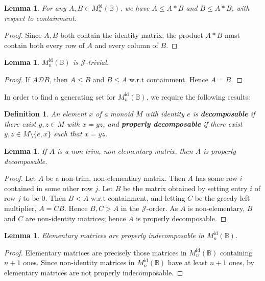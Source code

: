 \documentclass[11pt]{article}
\newtheorem{lemma}[thm]{Lemma}
\newtheorem{defi}[thm]{Definition}
\newcommand{\defn}[1]{\textbf{\textit{#1}}}
\numberwithin{equation}{section}
\newcommand{\B}{\mathbb{B}}
\newcommand{\Refn}{M_n^{\text{id}}(\B)}
\newcommand{\D}{\mathscr{D}}
\newcommand{\J}{\mathscr{J}}
\begin{document}
\begin{lemma}
  For any $A, B \in \Refn$, we have $A \leq A * B$ and $B \leq A * B$, with
  respect to containment.
\end{lemma}
\begin{proof}
  Since $A, B$ both contain the identity matrix, the product $A * B$ must
  contain both every row of $A$ and every column of $B$.
\end{proof}

\begin{lemma}
  $\Refn$ is $\J$-trivial. 
\end{lemma}
\begin{proof}
  If $A \D B$, then $A \leq B$ and $B \leq A$ w.r.t containment. Hence $A = B$.    
\end{proof}


In order to find a generating set for $\Refn$, we require the following results:

\begin{defi}
  An element $x$ of a monoid $M$ with identity $e$ is \defn{decomposable} if
  there exist $y, z \in M$ with $x = yz$, and \defn{properly decomposable} if
  there exist $y, z \in M\setminus\{e, x\}$ such that $x = yz$.
\end{defi}

\begin{lemma}
  If $A$ is a non-trim, non-elementary matrix, then $A$ is properly
  decomposable.
\end{lemma}
\begin{proof}
Let $A$ be a non-trim, non-elementary matrix. Then $A$ has some row $i$
contained in some other row $j$. Let $B$ be the matrix obtained by setting entry
$i$ of row $j$ to be $0$. Then $B < A$ w.r.t containment, and letting $C$ be the
greedy left multiplier, $A = CB$. Hence $B, C > A$ in the $\J$-order. As $A$ is
non-elementary, $B$ and $C$ are non-identity matrices; hence $A$ is properly
decomposable.
\end{proof}

\begin{lemma}
  Elementary matrices are properly indecomposable in $\Refn$.
\end{lemma}
\begin{proof}
  Elementary matrices are precisely those matrices in $\Refn$ containing $n + 1$
  ones. Since non-identity matrices in $\Refn$ have at least $n + 1$ ones, by
   elementary matrices are not properly
  indecomposable.
\end{proof}
\end{document}

